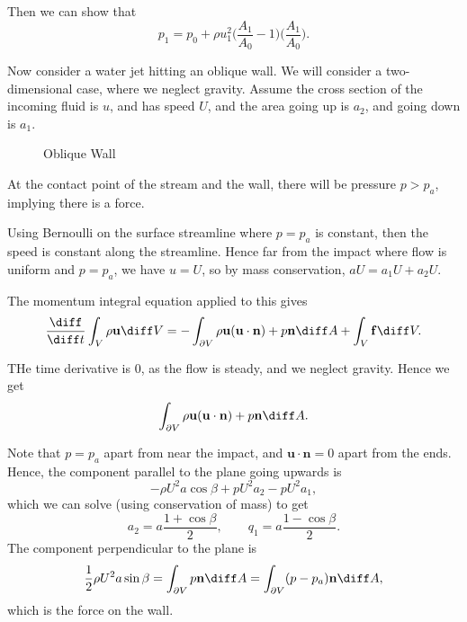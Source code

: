\documentclass[12pt]{article}
\begin{document}
Then we can show that
\[
p_1 = p_0 + \rho u_1^2 \biggl( \frac{A_1}{A_0} - 1 \biggr) \biggl( \frac{A_1}{A_0} \biggr)
.\]

Now consider a water jet hitting an oblique wall. We will consider a two-dimensional case, where we neglect gravity. Assume the cross section of the incoming fluid is $u$, and has speed $U$, and the area going up is $a_2$, and going down is $a_1$.

\begin{figure}[h]
	\centering%
	\caption{Oblique Wall}
	\label{fig:oblique_wall}
\end{figure}

At the contact point of the stream and the wall, there will be pressure $p > p_a$, implying there is a force.

Using Bernoulli on the surface streamline where $p = p_a$ is constant, then the speed is constant along the streamline. Hence far from the impact where flow is uniform and $p = p_a$, we have $u = U$, so by mass conservation, $aU = a_1U + a_2U$.

The momentum integral equation applied to this gives
\[
\frac{\diff}{\diff t} \int_{V} \rho \mathbf{u} \diff V = - \int_{\partial V} \rho \mathbf{u} (\mathbf{u} \cdot \mathbf{n}) + p \mathbf{n} \diff A + \int_{V} \mathbf{f} \diff V
.\]

THe time derivative is 0, as the flow is steady, and we neglect gravity. Hence we get
\[
\int_{\partial V} \rho \mathbf{u} (\mathbf{u} \cdot \mathbf{n}) + p \mathbf{n} \diff A
.\]

Note that $p = p_a$ apart from near the impact, and $\mathbf{u} \cdot \mathbf{n} = 0$ apart from the ends. Hence, the component parallel to the plane going upwards is
\[
-\rho U^2 a \cos \beta + p U^2 a_2 - p U^2 a_1
,\]
which we can solve (using conservation of mass) to get
\[
a_2 = a \frac{1 + \cos \beta}{2}, \qquad q_1 = a \frac{1 - \cos \beta}{2}
.\]
The component perpendicular to the plane is
\[
\frac{1}{2} \rho U^2 a \sin \beta = \int_{\partial V} p \mathbf{n} \diff A = \int_{\partial V} (p - p_a)\mathbf{n} \diff A
,\]
which is the force on the wall.
\end{document}
